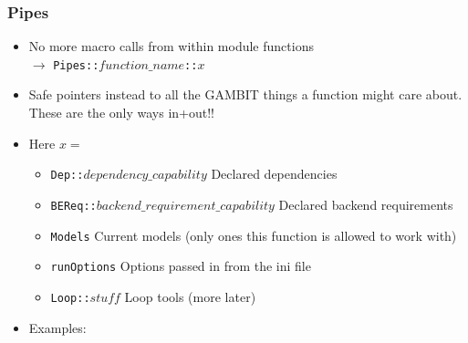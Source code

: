 \documentclass[xcolor=dvipsnames]{beamer}
\newcommand{\src}[2]{%
  {
    \footnotesize
    \href
    {https://gambit.hepforge.org/trac/browser/modules/#1}
    {\textcolor{darkMahogany}{\texttt{#2}}}
  }
}
\begin{document}
\begin{frame}
\frametitle{Pipes}

\begin{itemize}
\item No more macro calls from within module functions \\$\rightarrow$ \texttt{Pipes::$function\_name$::$x$}
\item Safe pointers instead to all the GAMBIT things a function might care about. \alert{These are the only ways in+out!!}\vspace{3mm}
\item Here $x =$\begin{itemize}
\item \texttt{Dep::$dependency\_capability$}  Declared dependencies
\item \texttt{BEReq::$backend\_requirement\_capability$}  Declared backend requirements
\item \texttt{Models}  Current models (only ones this function is allowed to work with)
\item \texttt{runOptions}  Options passed in from the ini file
\item \texttt{Loop::$stuff$} Loop tools (more later)
\end{itemize}\vspace{3mm}
\item Examples:
\end{itemize}

\end{frame}
\end{document}
